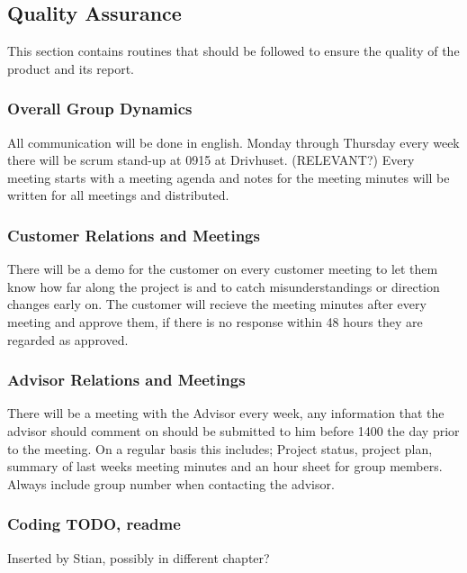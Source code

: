 \subsection{Quality Assurance}

This section contains routines that should be followed to ensure the 
quality of the product and its report.

\subsubsection{Overall Group Dynamics}

All communication will be done in english.
Monday through Thursday every week there will be scrum stand-up at 0915 at Drivhuset. (RELEVANT?)
Every meeting starts with a meeting agenda and notes for the meeting minutes will be
written for all meetings and distributed.

\subsubsection{Customer Relations and Meetings}

There will be a demo for the customer on every customer meeting to let them
know how far along the project is and to catch misunderstandings or direction changes early on.
The customer will recieve the meeting minutes after every meeting and approve them, 
if there is no response within 48 hours they are regarded as approved.

\subsubsection{Advisor Relations and Meetings}

There will be a meeting with the Advisor every week, any information that the advisor
should comment on should be submitted to him before 1400 the day prior to the meeting.
On a regular basis this includes; Project status, project plan, summary of last weeks meeting minutes and an hour sheet for group members.
Always include group number when contacting the advisor.

\subsubsection{Coding TODO, readme}
	Inserted by Stian, possibly in different chapter?

